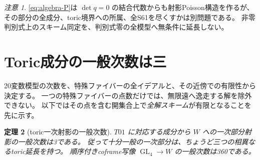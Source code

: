 \documentclass[11pt,a4paper]{ltjsarticle}
\DeclareMathOperator{\GL}{GL}
\newtheorem{theorem}{定理}[section]
\theoremstyle{remark}
\newtheorem{remark}[theorem]{注意}
\begin{document}
\begin{remark}
\eqref{eq:algebra-P}は $\det q=0$ の結合代数からも射影Poisson構造を作るが、
その部分の全成分、toric境界への所属、全S61を尽くすかは別問題である。
非零判別式上のスキーム同定を、判別式零の全模型へ無条件に延長しない。
\end{remark}

\section{Toric成分の一般次数は三}\label{sec:toric-degree}
20変数模型の次数を、特殊ファイバーの全イデアルと、その近傍での有限性から決定する。
一つの特殊ファイバーの点数だけでは、無限遠へ逸走する解を除外できない。
以下ではその点を含む開集合上で\emph{全解スキーム}が有限となることを先に示す。

\begin{theorem}[toric一次射影の一般次数]\label{thm:toric-degree}
$T01$ に対応する成分から $W$ への一次部分射影の一般次数は3である。
従って十分一般の一次部分は、ちょうど三つの相異なるtoric延長を持つ。
順序付きcoframe写像 $\GL_4\to W$ の一般次数は360である。
\end{theorem}
\end{document}
